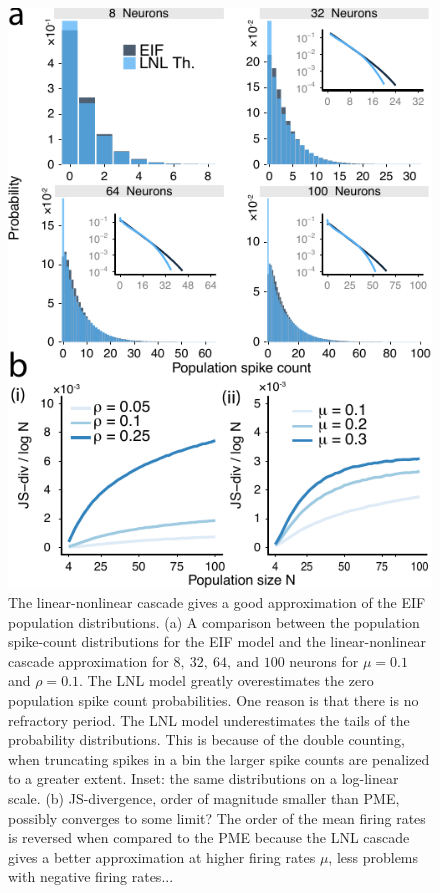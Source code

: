 \documentclass[%
 reprint,
 twocolumn,
 amsmath,amssymb,
 aps,
floatfix,
]{revtex4}
\begin{document}
\begin{figure}[h]
\includegraphics{figures/fig_4a}
\caption{\label{fig:eiffilter} The linear-nonlinear cascade gives a good approximation of the EIF population distributions. (a) A comparison between the population spike-count distributions for the EIF model and the linear-nonlinear cascade approximation for $8,~32,~64,~\text{and } 100$ neurons for $\mu = 0.1$ and $\rho = 0.1$. The LNL model greatly overestimates the zero population spike count probabilities. One reason is that there is no refractory period. The LNL model underestimates the tails of the probability distributions. This is because of the double counting, when truncating spikes in a bin the larger spike counts are penalized to a greater extent. Inset: the same distributions on a log-linear scale. (b) JS-divergence, order of magnitude smaller than PME, possibly converges to some limit? The order of the mean firing rates is reversed when compared to the PME because the LNL cascade gives a better approximation at higher firing rates $\mu$, less problems with negative firing rates...}
\end{figure}
\end{document}
